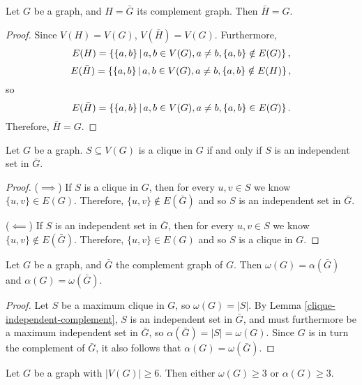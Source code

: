 \begin{prop}
    Let $G$ be a graph, and $H = \bar{G}$ its complement graph. Then $\bar{H} = G$.
\end{prop}

\begin{proof}
    Since $V(H) = V(G)$, $V(\bar{H}) = V(G)$. Furthermore,
    \[E(H) = \left\{\{a, b\} \,\middle|\, a, b \in V(G), a \neq b, \{a, b\} \notin E(G) \right\},\] \[E(\bar{H}) = \left\{\{a, b\} \,\middle|\, a, b \in V(G), a \neq b, \{a, b\} \notin E(H) \right\},\] so \[E(\bar{H}) = \left\{\{a, b\} \,\middle|\, a, b \in V(G), a \neq b, \{a, b\} \in E(G) \right\}.\] Therefore, $\bar{H} = G$.
\end{proof}

\begin{lemma}\label{clique-independent-complement}
    Let $G$ be a graph. $S \subseteq V(G)$ is a clique in $G$ if and only if $S$ is an independent set in $\bar{G}$.
\end{lemma}

\begin{proof}\proofbreak
    ($\implies$) If $S$ is a clique in $G$, then for every $u, v \in S$ we know $\{u, v\} \in E(G)$. Therefore, $\{u, v\} \notin E(\bar{G})$ and so $S$ is an independent set in $\bar{G}$.

    ($\impliedby$) If $S$ is an independent set in $\bar{G}$, then for every $u, v \in S$ we know $\{u, v\} \notin E(\bar{G})$. Therefore, $\{u, v\} \in E(G)$ and so $S$ is a clique in $G$.
\end{proof}

\begin{thm}
    Let $G$ be a graph, and $\bar{G}$ the complement graph of $G$. Then $\omega(G) = \alpha(\bar{G})$ and $\alpha(G) = \omega(\bar{G})$.
\end{thm}

\begin{proof}
    Let $S$ be a maximum clique in $G$, so $\omega(G) = |S|$. By Lemma \ref{clique-independent-complement}, $S$ is an independent set in $\bar{G}$, and must furthermore be a maximum independent set in $\bar{G}$, so $\alpha(\bar{G}) = |S| = \omega(G)$. Since $G$ is in turn the complement of $\bar{G}$, it also follows that $\alpha(G) = \omega(\bar{G})$.
\end{proof}

\begin{thm}
    Let $G$ be a graph with $|V(G)| \geq 6$. Then either $\omega(G) \geq 3$ or $\alpha(G) \geq 3$.
\end{thm}

